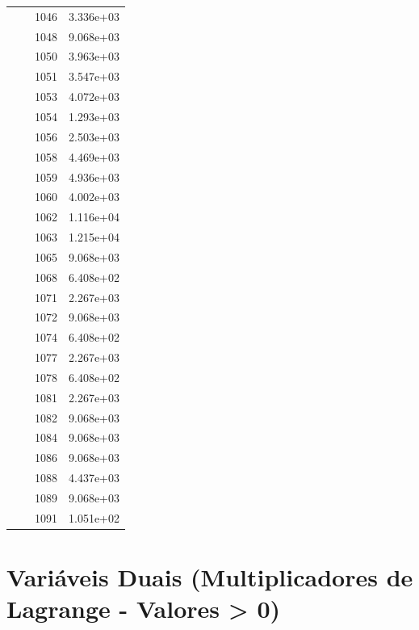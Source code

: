 \documentclass[12pt]{article}
\begin{document}
\begin{longtable}{@{}cccc@{}}
 &  & 1046 & 3.336e+03 \\
 &  & 1048 & 9.068e+03 \\
 &  & 1050 & 3.963e+03 \\
 &  & 1051 & 3.547e+03 \\
 &  & 1053 & 4.072e+03 \\
 &  & 1054 & 1.293e+03 \\
 &  & 1056 & 2.503e+03 \\
 &  & 1058 & 4.469e+03 \\
 &  & 1059 & 4.936e+03 \\
 &  & 1060 & 4.002e+03 \\
 &  & 1062 & 1.116e+04 \\
 &  & 1063 & 1.215e+04 \\
 &  & 1065 & 9.068e+03 \\
 &  & 1068 & 6.408e+02 \\
 &  & 1071 & 2.267e+03 \\
 &  & 1072 & 9.068e+03 \\
 &  & 1074 & 6.408e+02 \\
 &  & 1077 & 2.267e+03 \\
 &  & 1078 & 6.408e+02 \\
 &  & 1081 & 2.267e+03 \\
 &  & 1082 & 9.068e+03 \\
 &  & 1084 & 9.068e+03 \\
 &  & 1086 & 9.068e+03 \\
 &  & 1088 & 4.437e+03 \\
 &  & 1089 & 9.068e+03 \\
 &  & 1091 & 1.051e+02 \\

\bottomrule
\end{longtable}


\section{Variáveis Duais (Multiplicadores de Lagrange - Valores > 0)}
\end{document}
